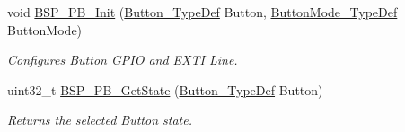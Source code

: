 \begin{DoxyCompactItemize}
void \hyperlink{group__B-L072Z-LRWAN1__LOW__LEVEL__Private__Defines_gad31c8db50a71c1f6dbfe132d72ba0bc6}{B\+S\+P\+\_\+\+P\+B\+\_\+\+Init} (\hyperlink{group__B-L072Z-LRWAN1__LOW__LEVEL__Exported__Types_ga643816dfbad5c734fc25a29ce8d35bb1}{Button\+\_\+\+Type\+Def} Button, \hyperlink{group__B-L072Z-LRWAN1__LOW__LEVEL__Exported__Types_ga48825b7c7d851c440ef8e808fd9d8f0a}{Button\+Mode\+\_\+\+Type\+Def} Button\+Mode)
\begin{DoxyCompactList}\small\item\em Configures Button G\+P\+IO and E\+X\+TI Line. \end{DoxyCompactList}\item 
uint32\+\_\+t \hyperlink{group__B-L072Z-LRWAN1__LOW__LEVEL__Private__Defines_ga8f0978b6cffda9c67266ddfdb3a0abf7}{B\+S\+P\+\_\+\+P\+B\+\_\+\+Get\+State} (\hyperlink{group__B-L072Z-LRWAN1__LOW__LEVEL__Exported__Types_ga643816dfbad5c734fc25a29ce8d35bb1}{Button\+\_\+\+Type\+Def} Button)
\begin{DoxyCompactList}\small\item\em Returns the selected Button state. \end{DoxyCompactList}\end{DoxyCompactItemize}

